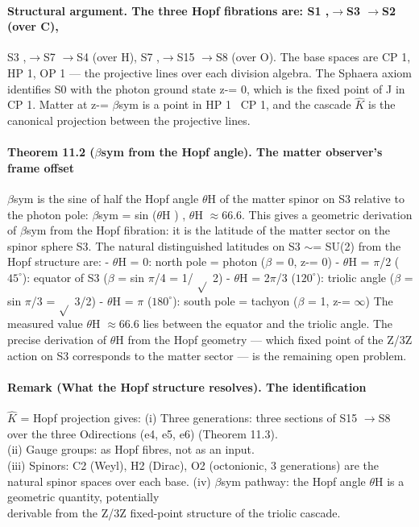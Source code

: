 \documentclass[12pt,a4paper]{article}
\begin{document}
\paragraph*{Structural argument. The three Hopf fibrations are: S1 ,$\to$S3 $\to$S2 (over C),}
S3 ,$\to$S7 $\to$S4 (over H), S7 ,$\to$S15 $\to$S8 (over O). The base spaces are CP 1, HP 1, OP 1 --- the projective lines over each division algebra. The Sphaera axiom identifies S0 with the photon ground state z-= 0, which is the fixed point of J in CP 1. Matter at z-= $\beta$sym is a point in HP 1 \ CP 1, and the cascade $\hat K$ is the canonical projection between the projective lines.
\paragraph*{Theorem 11.2 ($\beta$sym from the Hopf angle). The matter observer's frame offset}
$\beta$sym is the sine of half the Hopf angle $\theta$H of the matter spinor on S3 relative to the photon pole: $\beta$sym = sin ($\theta$H ) , $\theta$H $\approx$66.6. This gives a geometric derivation of $\beta$sym from the Hopf fibration: it is the latitude of the matter sector on the spinor sphere S3. The natural distinguished latitudes on S3 $\sim$= SU(2) from the Hopf structure are:
- $\theta$H = 0: north pole = photon ($\beta$ = 0, z-= 0)
- $\theta$H = $\pi$/2 ($45^\circ$): equator of S3 ($\beta$ = sin $\pi$/4 = 1/
$\sqrt{}$ 2)
- $\theta$H = 2$\pi$/3 ($120^\circ$): triolic angle ($\beta$ = sin $\pi$/3 =
$\sqrt{}$ 3/2)
- $\theta$H = $\pi$ ($180^\circ$): south pole = tachyon ($\beta$ = 1, z-= $\infty$)
The measured value $\theta$H $\approx$66.6 lies between the equator and the triolic angle. The precise derivation of $\theta$H from the Hopf geometry --- which fixed point of the Z/3Z action on S3 corresponds to the matter sector --- is the remaining open problem.
\paragraph*{Remark (What the Hopf structure resolves). The identification}
$\hat K$ = Hopf projection gives:
(i) Three generations: three sections of S15 $\to$S8 over the three Odirections (e4, e5, e6) (Theorem 11.3).\\
(ii) Gauge groups: as Hopf fibres, not as an input.\\
(iii) Spinors: C2 (Weyl), H2 (Dirac), O2 (octonionic, 3 generations) are the\\
natural spinor spaces over each base.
(iv) $\beta$sym pathway: the Hopf angle $\theta$H is a geometric quantity, potentially\\
derivable from the Z/3Z fixed-point structure of the triolic cascade.
\end{document}
